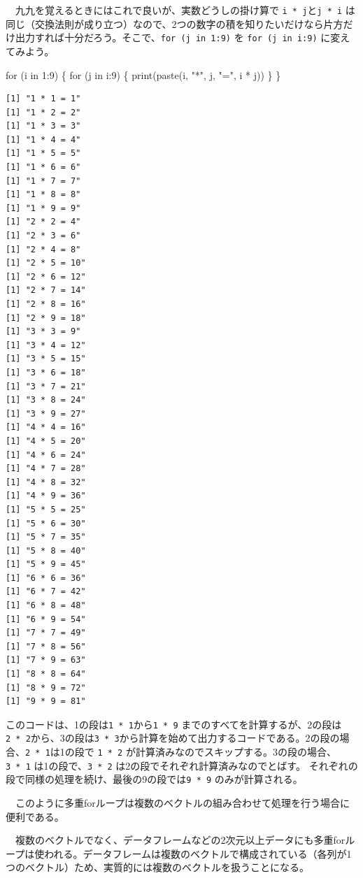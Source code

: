 \documentclass[
  a4paper,
  pandoc,
  ja=standard,
  jafont=haranoaji]{bxjsbook}
\newenvironment{Shaded}{\begin{snugshade}}{\end{snugshade}}
\newcommand{\ControlFlowTok}[1]{\textcolor[rgb]{0.00,0.48,0.65}{#1}}
\newcommand{\DecValTok}[1]{\textcolor[rgb]{0.68,0.00,0.00}{#1}}
\newcommand{\FunctionTok}[1]{\textcolor[rgb]{0.28,0.35,0.67}{#1}}
\newcommand{\NormalTok}[1]{\textcolor[rgb]{0.00,0.48,0.65}{#1}}
\newcommand{\SpecialCharTok}[1]{\textcolor[rgb]{0.37,0.37,0.37}{#1}}
\newcommand{\StringTok}[1]{\textcolor[rgb]{0.13,0.47,0.30}{#1}}
\begin{document}
　九九を覚えるときにはこれで良いが、実数どうしの掛け算で
\texttt{i\ *\ j}と\texttt{j\ *\ i}
は同じ（交換法則が成り立つ）なので、2つの数字の積を知りたいだけなら片方だけ出力すれば十分だろう。そこで、\texttt{for\ (j\ in\ 1:9)}
を \texttt{for\ (j\ in\ i:9)} に変えてみよう。

\begin{Shaded}
\begin{Highlighting}[numbers=left,,]
\ControlFlowTok{for}\NormalTok{ (i }\ControlFlowTok{in} \DecValTok{1}\SpecialCharTok{:}\DecValTok{9}\NormalTok{) \{}
  \ControlFlowTok{for}\NormalTok{ (j }\ControlFlowTok{in}\NormalTok{ i}\SpecialCharTok{:}\DecValTok{9}\NormalTok{) \{}
    \FunctionTok{print}\NormalTok{(}\FunctionTok{paste}\NormalTok{(i, }\StringTok{"*"}\NormalTok{, j, }\StringTok{"="}\NormalTok{, i }\SpecialCharTok{*}\NormalTok{ j))}
\NormalTok{  \}}
\NormalTok{\}}
\end{Highlighting}
\end{Shaded}

\begin{verbatim}
[1] "1 * 1 = 1"
[1] "1 * 2 = 2"
[1] "1 * 3 = 3"
[1] "1 * 4 = 4"
[1] "1 * 5 = 5"
[1] "1 * 6 = 6"
[1] "1 * 7 = 7"
[1] "1 * 8 = 8"
[1] "1 * 9 = 9"
[1] "2 * 2 = 4"
[1] "2 * 3 = 6"
[1] "2 * 4 = 8"
[1] "2 * 5 = 10"
[1] "2 * 6 = 12"
[1] "2 * 7 = 14"
[1] "2 * 8 = 16"
[1] "2 * 9 = 18"
[1] "3 * 3 = 9"
[1] "3 * 4 = 12"
[1] "3 * 5 = 15"
[1] "3 * 6 = 18"
[1] "3 * 7 = 21"
[1] "3 * 8 = 24"
[1] "3 * 9 = 27"
[1] "4 * 4 = 16"
[1] "4 * 5 = 20"
[1] "4 * 6 = 24"
[1] "4 * 7 = 28"
[1] "4 * 8 = 32"
[1] "4 * 9 = 36"
[1] "5 * 5 = 25"
[1] "5 * 6 = 30"
[1] "5 * 7 = 35"
[1] "5 * 8 = 40"
[1] "5 * 9 = 45"
[1] "6 * 6 = 36"
[1] "6 * 7 = 42"
[1] "6 * 8 = 48"
[1] "6 * 9 = 54"
[1] "7 * 7 = 49"
[1] "7 * 8 = 56"
[1] "7 * 9 = 63"
[1] "8 * 8 = 64"
[1] "8 * 9 = 72"
[1] "9 * 9 = 81"
\end{verbatim}

このコードは、1の段は\texttt{1\ *\ 1}から\texttt{1\ *\ 9}
までのすべてを計算するが、2の段は\texttt{2\ *\ 2}から、3の段は\texttt{3\ *\ 3}から計算を始めて出力するコードである。2の段の場合、\texttt{2\ *\ 1}は1の段で
\texttt{1\ *\ 2}
が計算済みなのでスキップする。3の段の場合、\texttt{3\ *\ 1}
は1の段で、\texttt{3\ *\ 2} は2の段でそれぞれ計算済みなのでとばす。
それぞれの段で同様の処理を続け、最後の9の段では\texttt{9\ *\ 9}
のみが計算される。

　このように多重forループは複数のベクトルの組み合わせて処理を行う場合に便利である。

　複数のベクトルでなく、データフレームなどの2次元以上データにも多重forループは使われる。データフレームは複数のベクトルで構成されている（各列が1つのベクトル）ため、実質的には複数のベクトルを扱うことになる。
\end{document}
